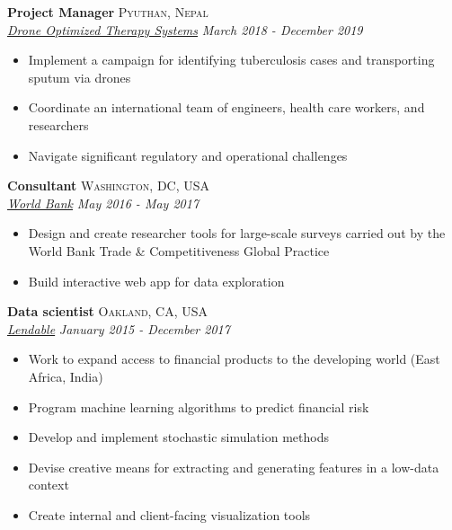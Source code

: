 \documentclass[11pt]{article}
\begin{document}
\noindent \textbf{Project Manager} \hfill \textsc{Pyuthan, Nepal}\\
\noindent \emph{\href{http://droneots.com/}{Drone Optimized Therapy Systems}} \hfill \emph{March 2018 - December 2019}
\vspace{-2mm}
\begin{itemize}\itemsep0pt \parskip0pt 
\item Implement a campaign for identifying tuberculosis cases and transporting sputum via drones
\item Coordinate an international team of engineers, health care workers, and researchers
\item Navigate significant regulatory and operational challenges 
\end{itemize}


\noindent \textbf{Consultant} \hfill \textsc{Washington, DC, USA}\\
\noindent \emph{\href{http://www.worldbank.org/}{World Bank}} \hfill \emph{May 2016 - May 2017}
\vspace{-2mm}
\begin{itemize}\itemsep0pt \parskip0pt 
\item Design and create researcher tools for large-scale surveys carried out by the World Bank Trade & Competitiveness Global Practice
\item Build interactive web app for data exploration
\end{itemize}

\noindent \textbf{Data scientist} \hfill \textsc{Oakland, CA, USA}\\
\noindent \emph{\href{http://lendable.io}{Lendable}} \hfill \emph{January 2015 - December 2017}
\vspace{-2mm}
\begin{itemize}\itemsep0pt \parskip0pt 
\item Work to expand access to financial products to the developing world (East Africa, India)
\item Program machine learning algorithms to predict financial risk
\item Develop and implement stochastic simulation methods 
\item Devise creative means for extracting and generating features in a low-data context 
\item Create internal and client-facing visualization tools
\end{itemize}
\end{document}
